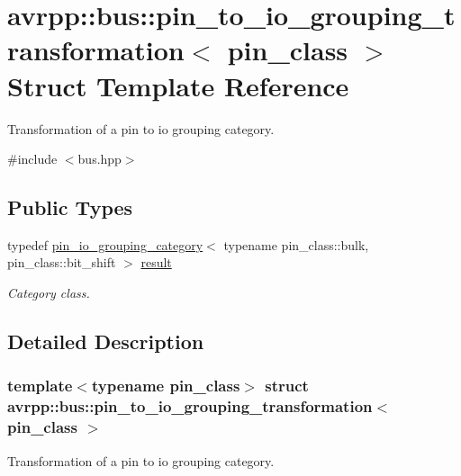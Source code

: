 \hypertarget{structavrpp_1_1bus_1_1pin__to__io__grouping__transformation}{
\section{avrpp::bus::pin\_\-to\_\-io\_\-grouping\_\-transformation$<$ pin\_\-class $>$ Struct Template Reference}
\label{structavrpp_1_1bus_1_1pin__to__io__grouping__transformation}
}


Transformation of a pin to io grouping category.  




{\ttfamily \#include $<$bus.hpp$>$}

\subsection*{Public Types}
\begin{DoxyCompactItemize}
\item 
typedef \hyperlink{structavrpp_1_1bus_1_1pin__io__grouping__category}{pin\_\-io\_\-grouping\_\-category}$<$ typename pin\_\-class::bulk, pin\_\-class::bit\_\-shift $>$ \hyperlink{structavrpp_1_1bus_1_1pin__to__io__grouping__transformation_abc7845cc4338956086ecbf86cd67f674}{result}
\begin{DoxyCompactList}\small\item\em Category class. \item\end{DoxyCompactList}\end{DoxyCompactItemize}


\subsection{Detailed Description}
\subsubsection*{template$<$typename pin\_\-class$>$ struct avrpp::bus::pin\_\-to\_\-io\_\-grouping\_\-transformation$<$ pin\_\-class $>$}

Transformation of a pin to io grouping category. 

